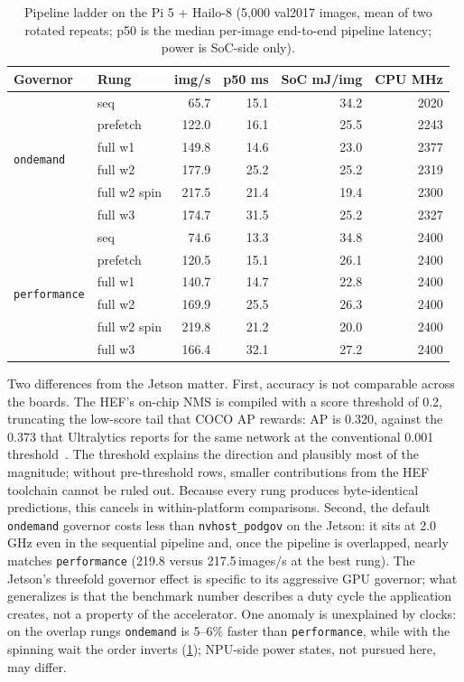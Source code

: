 \begin{table}[t]
\centering
\caption{Pipeline ladder on the Pi 5 + Hailo-8 (5,000 val2017 images,
mean of two rotated repeats; p50 is the median per-image end-to-end
pipeline latency; power is SoC-side only).}
\label{tab:piladder}
\footnotesize
\setlength{\tabcolsep}{3.4pt}
\begin{tabular}{@{}llrrrr@{}}
\toprule
Governor & Rung & img/s & p50 ms & SoC mJ/img & CPU MHz \\
\midrule
\multirow{6}{*}{\texttt{ondemand}}
 & seq           &  65.7 & 15.1 & 34.2 & 2020 \\
 & prefetch      & 122.0 & 16.1 & 25.5 & 2243 \\
 & full w1       & 149.8 & 14.6 & 23.0 & 2377 \\
 & full w2       & 177.9 & 25.2 & 25.2 & 2319 \\
 & full w2 spin  & 217.5 & 21.4 & 19.4 & 2300 \\
 & full w3       & 174.7 & 31.5 & 25.2 & 2327 \\
\midrule
\multirow{6}{*}{\texttt{performance}}
 & seq           &  74.6 & 13.3 & 34.8 & 2400 \\
 & prefetch      & 120.5 & 15.1 & 26.1 & 2400 \\
 & full w1       & 140.7 & 14.7 & 22.8 & 2400 \\
 & full w2       & 169.9 & 25.5 & 26.3 & 2400 \\
 & full w2 spin  & 219.8 & 21.2 & 20.0 & 2400 \\
 & full w3       & 166.4 & 32.1 & 27.2 & 2400 \\
\bottomrule
\end{tabular}
\end{table}

Two differences from the Jetson matter. First, accuracy is not
comparable across the boards. The HEF's on-chip NMS is compiled with a
score threshold of 0.2, truncating the low-score tail that COCO AP
rewards: AP is 0.320, against the 0.373 that Ultralytics reports for
the same network at the conventional 0.001
threshold~\cite{ultralytics2023yolov8}. The threshold explains the
direction and plausibly most of the magnitude; without pre-threshold
rows, smaller contributions from the HEF toolchain cannot be ruled
out. Because every rung produces byte-identical predictions, this
cancels in within-platform comparisons. Second, the default
\texttt{ondemand} governor costs less than \texttt{nvhost\_podgov} on
the Jetson: it sits at 2.0\,GHz even in the sequential pipeline and,
once the pipeline is overlapped, nearly matches \texttt{performance}
(219.8 versus 217.5\,images/s at the best rung). The Jetson's
threefold governor effect is specific to its aggressive GPU governor;
what generalizes is that the benchmark number describes a duty cycle
the application creates, not a property of the accelerator. One
anomaly is unexplained by clocks: on the overlap rungs
\texttt{ondemand} is 5--6\% faster than \texttt{performance}, while
with the spinning wait the order inverts (\cref{tab:piladder});
NPU-side power states, not pursued here, may differ.

